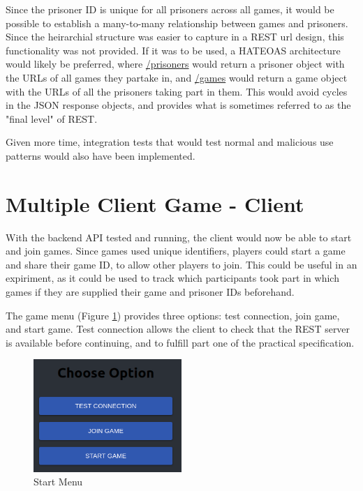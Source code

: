 \documentclass[12pt]{article}
\begin{document}
Since the prisoner ID is unique for all prisoners across all games, it would be possible to establish a many-to-many relationship between games and prisoners. Since the heirarchial structure was easier to capture in a REST url design, this functionality was not provided. If it was to be used, a HATEOAS architecture would likely be preferred, where \url{/prisoners} would return a prisoner object with the URLs of all games they partake in, and \url{/games} would return a game object with the URLs of all the prisoners taking part in them. This would avoid cycles in the JSON response objects, and provides what is sometimes referred to as the "final level" of REST.

Given more time, integration tests that would test normal and malicious use patterns would also have been implemented. 

\part{Multiple Client Game - Client}

With the backend API tested and running, the client would now be able to start and join games. Since games used unique identifiers, players could start a game and share their game ID, to allow other players to join. This could be useful in an expiriment, as it could be used to track which participants took part in which games if they are supplied their game and prisoner IDs beforehand. 

The game menu (Figure \ref{fig:startmenu}) provides three options: test connection, join game, and start game. Test connection allows the client to check that the REST server is available before continuing, and to fulfill part one of the practical specification. 

\begin{figure}[!ht]
        \centering
        \includegraphics[width=0.5\textwidth]{images/menu} %
        \caption{Start Menu}
        \label{fig:startmenu}
\end{figure}
\end{document}
